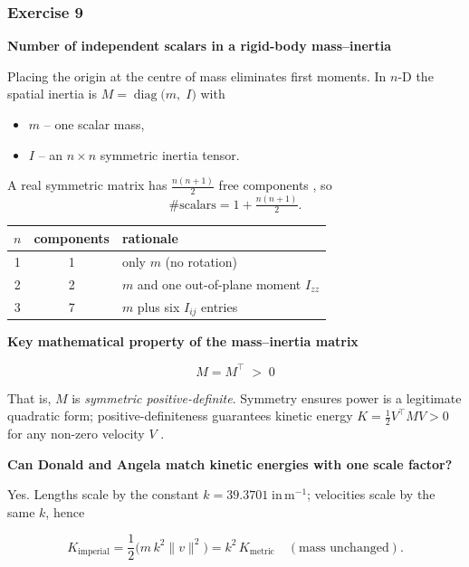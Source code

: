 \documentclass[12pt,a4paper]{article}
\begin{document}
\subsubsection*{Exercise 9}
\textbf{Number of independent scalars in a rigid-body mass–inertia}

Placing the origin at the centre of mass eliminates first moments.  
In $n$-D the spatial inertia is
\(
M=\operatorname{diag}\!\bigl(m,\;I\bigr)
\)
with  

\begin{itemize}
  \item $m$ – one scalar mass,
  \item $I$ – an $n\times n$ symmetric inertia tensor.
\end{itemize}

A real symmetric matrix has $\tfrac{n(n+1)}{2}$ free components
\cite{Murray1994}, so
\[
\#\text{scalars}=1+\tfrac{n(n+1)}{2}.
\]

\begin{center}
\renewcommand{\arraystretch}{1.2}
\begin{tabular}{c|c|l}
$n$ & components & rationale \\ \hline
1 & 1 & only $m$ (no rotation) \\ \hline
2 & 2 & $m$ and one out-of-plane moment $I_{zz}$ \cite[§2.4]{Spong2006} \\ \hline
3 & 7 & $m$ plus six $I_{ij}$ entries \cite[Eq.\,(3.11)]{Featherstone2014}
\end{tabular}
\end{center}

\textbf{Key mathematical property of the mass–inertia matrix}

\[
\boxed{\,M = M^{\!\top} \;>\; 0\,}
\]

That is, $M$ is \emph{symmetric positive-definite}.  
Symmetry ensures power is a legitimate quadratic form;
positive-definiteness guarantees kinetic energy
\(K=\frac12 V^{\!\top}MV>0\) for any non-zero velocity $V$
\cite[§7.2]{Asada2022}.

\textbf{Can Donald and Angela match kinetic energies with one scale factor?}

Yes.  Lengths scale by the constant
\(k = 39.3701\;\text{in}\,\mathrm{m}^{-1}\);
velocities scale by the same $k$, hence  

\[
K_{\text{imperial}}
  = \frac12 \bigl(m\,k^{2}\|v\|^{2}\bigr)
  = k^{2}\,K_{\text{metric}}
  \quad (\text{mass unchanged}).
\]
\end{document}
